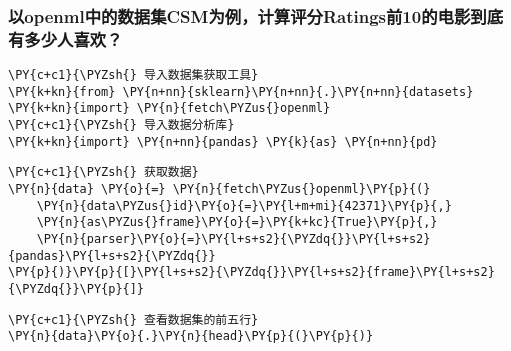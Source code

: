     \hypertarget{ux4ee5openmlux4e2dux7684ux6570ux636eux96c6csmux4e3aux4f8bux8ba1ux7b97ux8bc4ux5206ratingsux524d10ux7684ux7535ux5f71ux5230ux5e95ux6709ux591aux5c11ux4ebaux559cux6b22}{%
\subsubsection{以openml中的数据集CSM为例，计算评分Ratings前10的电影到底有多少人喜欢？}\label{ux4ee5openmlux4e2dux7684ux6570ux636eux96c6csmux4e3aux4f8bux8ba1ux7b97ux8bc4ux5206ratingsux524d10ux7684ux7535ux5f71ux5230ux5e95ux6709ux591aux5c11ux4ebaux559cux6b22}}

    \begin{tcolorbox}[breakable, size=fbox, boxrule=1pt, pad at break*=1mm,colback=cellbackground, colframe=cellborder]
\begin{Verbatim}[commandchars=\\\{\}]
\PY{c+c1}{\PYZsh{} 导入数据集获取工具}
\PY{k+kn}{from} \PY{n+nn}{sklearn}\PY{n+nn}{.}\PY{n+nn}{datasets} \PY{k+kn}{import} \PY{n}{fetch\PYZus{}openml}
\PY{c+c1}{\PYZsh{} 导入数据分析库}
\PY{k+kn}{import} \PY{n+nn}{pandas} \PY{k}{as} \PY{n+nn}{pd}
\end{Verbatim}
\end{tcolorbox}

    \begin{tcolorbox}[breakable, size=fbox, boxrule=1pt, pad at break*=1mm,colback=cellbackground, colframe=cellborder]
\begin{Verbatim}[commandchars=\\\{\}]
\PY{c+c1}{\PYZsh{} 获取数据}
\PY{n}{data} \PY{o}{=} \PY{n}{fetch\PYZus{}openml}\PY{p}{(}
    \PY{n}{data\PYZus{}id}\PY{o}{=}\PY{l+m+mi}{42371}\PY{p}{,}
    \PY{n}{as\PYZus{}frame}\PY{o}{=}\PY{k+kc}{True}\PY{p}{,}
    \PY{n}{parser}\PY{o}{=}\PY{l+s+s2}{\PYZdq{}}\PY{l+s+s2}{pandas}\PY{l+s+s2}{\PYZdq{}}
\PY{p}{)}\PY{p}{[}\PY{l+s+s2}{\PYZdq{}}\PY{l+s+s2}{frame}\PY{l+s+s2}{\PYZdq{}}\PY{p}{]}
\end{Verbatim}
\end{tcolorbox}

    \begin{tcolorbox}[breakable, size=fbox, boxrule=1pt, pad at break*=1mm,colback=cellbackground, colframe=cellborder]
\begin{Verbatim}[commandchars=\\\{\}]
\PY{c+c1}{\PYZsh{} 查看数据集的前五行}
\PY{n}{data}\PY{o}{.}\PY{n}{head}\PY{p}{(}\PY{p}{)}
\end{Verbatim}
\end{tcolorbox}

